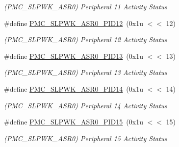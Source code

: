 \begin{DoxyCompactItemize}
\begin{DoxyCompactList}\small\item\em (P\+M\+C\+\_\+\+S\+L\+P\+W\+K\+\_\+\+A\+S\+R0) Peripheral 11 Activity Status \end{DoxyCompactList}\item 
\mbox{\label{group__SAMV71__PMC_gaedffc46071d316bb36e854eff5d0156e}} 
\#define \mbox{\hyperlink{group__SAMV71__PMC_gaedffc46071d316bb36e854eff5d0156e}{P\+M\+C\+\_\+\+S\+L\+P\+W\+K\+\_\+\+A\+S\+R0\+\_\+\+P\+I\+D12}}~(0x1u $<$$<$ 12)
\begin{DoxyCompactList}\small\item\em (P\+M\+C\+\_\+\+S\+L\+P\+W\+K\+\_\+\+A\+S\+R0) Peripheral 12 Activity Status \end{DoxyCompactList}\item 
\mbox{\label{group__SAMV71__PMC_ga682c66ee149768ea3d0d7e5d2865b39a}} 
\#define \mbox{\hyperlink{group__SAMV71__PMC_ga682c66ee149768ea3d0d7e5d2865b39a}{P\+M\+C\+\_\+\+S\+L\+P\+W\+K\+\_\+\+A\+S\+R0\+\_\+\+P\+I\+D13}}~(0x1u $<$$<$ 13)
\begin{DoxyCompactList}\small\item\em (P\+M\+C\+\_\+\+S\+L\+P\+W\+K\+\_\+\+A\+S\+R0) Peripheral 13 Activity Status \end{DoxyCompactList}\item 
\mbox{\label{group__SAMV71__PMC_gaf9d68e9ff1d3e5f08176860aa8c36a46}} 
\#define \mbox{\hyperlink{group__SAMV71__PMC_gaf9d68e9ff1d3e5f08176860aa8c36a46}{P\+M\+C\+\_\+\+S\+L\+P\+W\+K\+\_\+\+A\+S\+R0\+\_\+\+P\+I\+D14}}~(0x1u $<$$<$ 14)
\begin{DoxyCompactList}\small\item\em (P\+M\+C\+\_\+\+S\+L\+P\+W\+K\+\_\+\+A\+S\+R0) Peripheral 14 Activity Status \end{DoxyCompactList}\item 
\mbox{\label{group__SAMV71__PMC_ga17bb92cb5f3622e05eec01c3fca207f3}} 
\#define \mbox{\hyperlink{group__SAMV71__PMC_ga17bb92cb5f3622e05eec01c3fca207f3}{P\+M\+C\+\_\+\+S\+L\+P\+W\+K\+\_\+\+A\+S\+R0\+\_\+\+P\+I\+D15}}~(0x1u $<$$<$ 15)
\begin{DoxyCompactList}\small\item\em (P\+M\+C\+\_\+\+S\+L\+P\+W\+K\+\_\+\+A\+S\+R0) Peripheral 15 Activity Status \end{DoxyCompactList}\item 

\end{DoxyCompactItemize}
